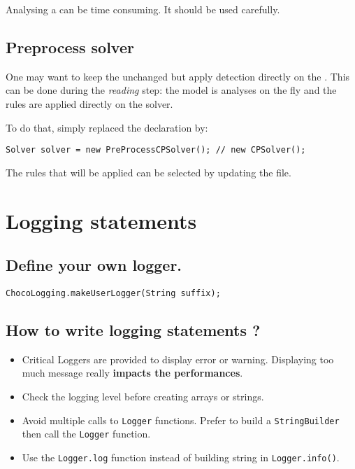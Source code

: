 \begin{note}
Analysing a  can be time consuming. It should be used carefully.
\end{note}
 
 



\subsection{Preprocess solver}\label{advanced:preprocesssolver}\hypertarget{advanced:preprocesssolver}{}

One may want to keep the  unchanged but apply detection directly on the . This can be done during the \textit{reading} step: the model is analyses on the fly and the rules are applied directly on the solver. 

To do that, simply replaced the  declaration by:
\begin{lstlisting}
Solver solver = new PreProcessCPSolver(); // new CPSolver();
\end{lstlisting} 

The rules that will be applied can be selected by updating the  file.


\section{Logging statements}\label{advanced:loggingstatements}\hypertarget{advanced:loggingstatements}{}

\subsection{Define your own logger.}\label{advanced:defineyourownlogger}\hypertarget{advanced:defineyourownlogger}{}
\begin{lstlisting}
ChocoLogging.makeUserLogger(String suffix);
\end{lstlisting}


\subsection{How to write logging statements ?}\label{advanced:howtowriteloggingstatements}\hypertarget{advanced:howtowriteloggingstatements}{}

\begin{itemize}
	\item Critical Loggers are provided to display error or warning. Displaying too much message really \textbf{impacts the performances}.
	\item Check the logging level before creating arrays or strings.
	\item Avoid multiple calls to \texttt{Logger} functions. Prefer to build a \texttt{StringBuilder} then call the \texttt{Logger} function.
	\item Use the \texttt{Logger.log} function instead of building string in \texttt{Logger.info()}.
\end{itemize}

